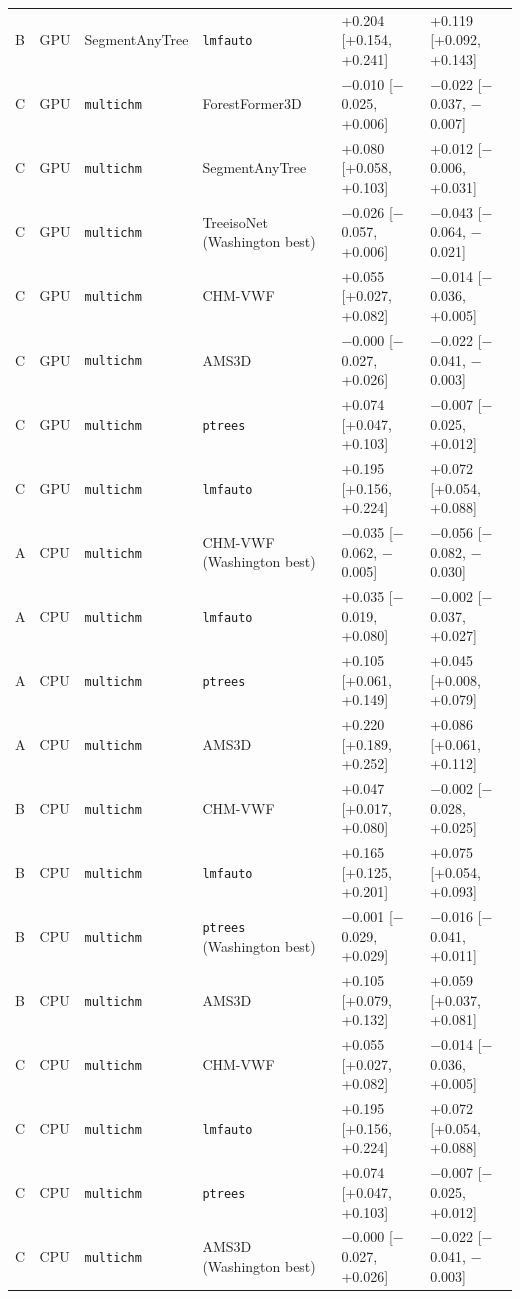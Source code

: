 \documentclass[10pt]{article}
\begin{document}
{\begin{xltabular}{\textwidth}{lllLLL}
B & GPU & SegmentAnyTree & \texttt{lmfauto} & +0.204 [+0.154, +0.241] & +0.119 [+0.092, +0.143] \\
C & GPU & \texttt{multichm} & ForestFormer3D & $-$0.010 [$-$0.025, +0.006] & $-$0.022 [$-$0.037, $-$0.007] \\
C & GPU & \texttt{multichm} & SegmentAnyTree & +0.080 [+0.058, +0.103] & +0.012 [$-$0.006, +0.031] \\
C & GPU & \texttt{multichm} & TreeisoNet (Washington best) & $-$0.026 [$-$0.057, +0.006] & $-$0.043 [$-$0.064, $-$0.021] \\
C & GPU & \texttt{multichm} & CHM-VWF & +0.055 [+0.027, +0.082] & $-$0.014 [$-$0.036, +0.005] \\
C & GPU & \texttt{multichm} & AMS3D & $-$0.000 [$-$0.027, +0.026] & $-$0.022 [$-$0.041, $-$0.003] \\
C & GPU & \texttt{multichm} & \texttt{ptrees} & +0.074 [+0.047, +0.103] & $-$0.007 [$-$0.025, +0.012] \\
C & GPU & \texttt{multichm} & \texttt{lmfauto} & +0.195 [+0.156, +0.224] & +0.072 [+0.054, +0.088] \\
A & CPU & \texttt{multichm} & CHM-VWF (Washington best) & $-$0.035 [$-$0.062, $-$0.005] & $-$0.056 [$-$0.082, $-$0.030] \\
A & CPU & \texttt{multichm} & \texttt{lmfauto} & +0.035 [$-$0.019, +0.080] & $-$0.002 [$-$0.037, +0.027] \\
A & CPU & \texttt{multichm} & \texttt{ptrees} & +0.105 [+0.061, +0.149] & +0.045 [+0.008, +0.079] \\
A & CPU & \texttt{multichm} & AMS3D & +0.220 [+0.189, +0.252] & +0.086 [+0.061, +0.112] \\
B & CPU & \texttt{multichm} & CHM-VWF & +0.047 [+0.017, +0.080] & $-$0.002 [$-$0.028, +0.025] \\
B & CPU & \texttt{multichm} & \texttt{lmfauto} & +0.165 [+0.125, +0.201] & +0.075 [+0.054, +0.093] \\
B & CPU & \texttt{multichm} & \texttt{ptrees} (Washington best) & $-$0.001 [$-$0.029, +0.029] & $-$0.016 [$-$0.041, +0.011] \\
B & CPU & \texttt{multichm} & AMS3D & +0.105 [+0.079, +0.132] & +0.059 [+0.037, +0.081] \\
C & CPU & \texttt{multichm} & CHM-VWF & +0.055 [+0.027, +0.082] & $-$0.014 [$-$0.036, +0.005] \\
C & CPU & \texttt{multichm} & \texttt{lmfauto} & +0.195 [+0.156, +0.224] & +0.072 [+0.054, +0.088] \\
C & CPU & \texttt{multichm} & \texttt{ptrees} & +0.074 [+0.047, +0.103] & $-$0.007 [$-$0.025, +0.012] \\
C & CPU & \texttt{multichm} & AMS3D (Washington best) & $-$0.000 [$-$0.027, +0.026] & $-$0.022 [$-$0.041, $-$0.003] \\
\end{xltabular}
}
\end{document}
